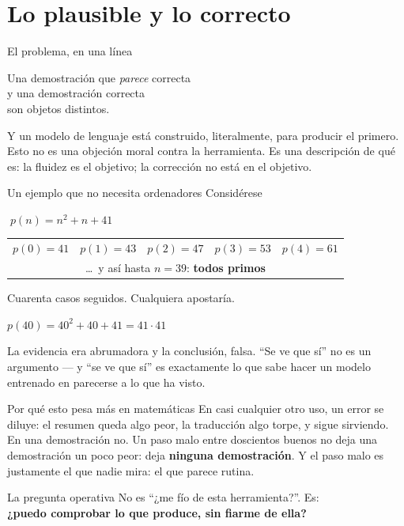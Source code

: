\documentclass[11pt,aspectratio=169]{beamer}
\begin{document}
\section{Lo plausible y lo correcto}

\begin{frame}{El problema, en una línea}
  \begin{center}
    \Large
    Una demostración que \emph{parece} correcta\\[0.5ex]
    y una demostración correcta\\[0.5ex]
    son objetos distintos.
  \end{center}
  \vfill
  Y un modelo de lenguaje está construido, literalmente, para producir el
  primero.
  \vfill
  Esto no es una objeción moral contra la herramienta. Es una descripción de
  qué es: la fluidez es el objetivo; la corrección no está en el objetivo.
\end{frame}

\begin{frame}{Un ejemplo que no necesita ordenadores}
  Considérese
  \begin{center}
    \Large $\; p(n) = n^{2} + n + 41 \;$
  \end{center}
  \vfill
  \begin{center}
    \begin{tabular}{lllll}
      \toprule
      $p(0)=41$ & $p(1)=43$ & $p(2)=47$ & $p(3)=53$ & $p(4)=61$ \\
      \multicolumn{5}{c}{\dots\ y así hasta $n=39$: \textbf{todos primos}} \\
      \bottomrule
    \end{tabular}
  \end{center}
  \vfill
  Cuarenta casos seguidos. Cualquiera apostaría.
  \vfill
  \begin{center}
    \large
    $p(40) = 40^{2} + 40 + 41 = 41 \cdot 41$
  \end{center}
  \vfill
  La evidencia era abrumadora y la conclusión, falsa. ``Se ve que sí'' no es un
  argumento --- y ``se ve que sí'' es exactamente lo que sabe hacer un modelo
  entrenado en parecerse a lo que ha visto.
\end{frame}

\begin{frame}{Por qué esto pesa más en matemáticas}
  En casi cualquier otro uso, un error se diluye: el resumen queda algo peor,
  la traducción algo torpe, y sigue sirviendo.
  \vfill
  En una demostración no. Un paso malo entre doscientos buenos no deja una
  demostración un poco peor: deja \textbf{ninguna demostración}.
  \vfill
  Y el paso malo es justamente el que nadie mira: el que parece rutina.
  \vfill
  \begin{block}{La pregunta operativa}
    No es ``¿me fío de esta herramienta?''. Es:\\
    \textbf{¿puedo comprobar lo que produce, sin fiarme de ella?}
  \end{block}
\end{frame}
\end{document}
